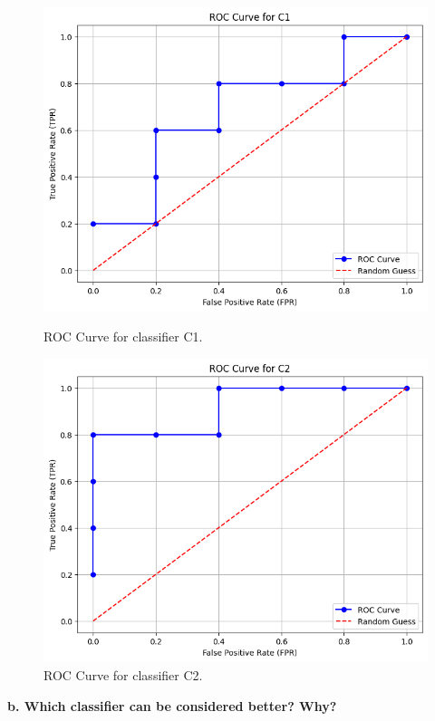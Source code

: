 \begin{figure}[h]
    \centering
    \begin{minipage}{0.49\textwidth}
        \centering
        \includegraphics[width=\textwidth]{media/hw5_q1_c1.png}
        \caption{ROC Curve for classifier C1.}
    \end{minipage}
    \hfill
    \begin{minipage}{0.49\textwidth}
        \centering
        \includegraphics[width=\textwidth]{media/hw5_q1_c2.png}
        \caption{ROC Curve for classifier C2.}
    \end{minipage}
\end{figure}


\textbf{b. Which classifier can be considered better? Why?}
